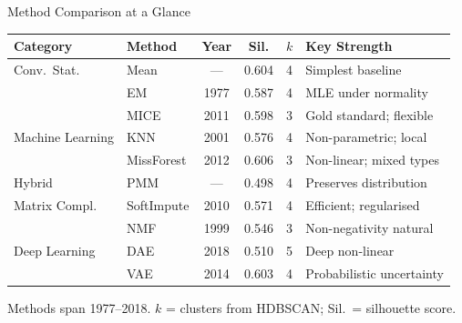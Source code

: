 \documentclass[aspectratio=169, 11pt]{beamer}
\begin{document}
\begin{frame}{Method Comparison at a Glance}
  \small
  \centering
  \begin{tabular}{l l c c c l}
    \toprule
    \textbf{Category} & \textbf{Method} & \textbf{Year} & \textbf{Sil.} & \textbf{$k$} & \textbf{Key Strength} \\
    \midrule
    Conv.\ Stat. & Mean & --- & 0.604 & 4 & Simplest baseline \\
                 & EM & 1977 & 0.587 & 4 & MLE under normality \\
                 & MICE & 2011 & 0.598 & 3 & Gold standard; flexible \\
    \midrule
    Machine Learning & KNN & 2001 & 0.576 & 4 & Non-parametric; local \\
                     & MissForest & 2012 & 0.606 & 3 & Non-linear; mixed types \\
    \midrule
    Hybrid & PMM & --- & 0.498 & 4 & Preserves distribution \\
    \midrule
    Matrix Compl. & SoftImpute & 2010 & 0.571 & 4 & Efficient; regularised \\
                  & NMF & 1999 & 0.546 & 3 & Non-negativity natural \\
    \midrule
    Deep Learning & DAE & 2018 & 0.510 & 5 & Deep non-linear \\
                  & VAE & 2014 & 0.603 & 4 & Probabilistic uncertainty \\
    \bottomrule
  \end{tabular}

  \vspace{0.5em}
  Methods span 1977--2018. $k$ = clusters from HDBSCAN; Sil.\ = silhouette score.
\end{frame}
\end{document}
